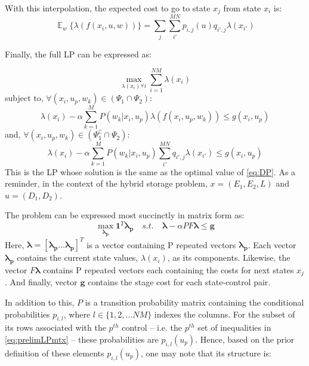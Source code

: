 \documentclass[conference]{IEEEtran}
\DeclareMathOperator{\E}{\mathbb{E}}
\begin{document}
With this interpolation, the expected cost to go to state $x_{j}$ from state $x_{i}$ is:
\begin{displaymath}
    \mathop{\E}_{w}\{\lambda(f(x_{i},u,w))\}=\sum_{j}\sum_{i'}^{MN}p_{i,j}(u)q_{i',j}\lambda(x_{i'})
\end{displaymath}

Finally, the full LP can be expressed as:

\begin{equation} \label{eq:prelimLP}
\max_{\lambda(x_{i}) \forall i} \sum_{i=1}^{NM} \lambda(x_{i})
\end{equation} subject to, $\forall (x_{i}, u_{p}, w_{k})\in(\Psi_{1}\cap\Psi_{2})$:
\begin{displaymath}
    \lambda(x_{i})-\alpha\sum_{k=1}^{M}P(w_{k} | x_{i},u_{p})\lambda(f(x_{i},u_{p},w_{k})) \leq g(x_{i},u_{p})
\end{displaymath} and, $\forall (x_{i}, u_{p}, w_{k})\in(\Psi_{1}^\complement\cap\Psi_{2})$:
\begin{displaymath}
    \lambda(x_{i})-\alpha\sum_{k=1}^{M}P(w_{k} | x_{i},u_{p})\sum_{i'}^{MN}q_{i',j}\lambda(x_{i'}) \leq g(x_{i},u_{p})
\end{displaymath} This is the LP whose solution is the same as the optimal value of \eqref{eq:DP}. As a reminder, in the context of the hybrid storage problem, $x=(E_{1},E_{2},L)$ and $u=(D_{1},D_{2})$.

The problem can be expressed most succinctly in matrix form as:
\begin{equation} \label{eq:prelimLPmtx}
    \max_{\boldsymbol{\lambda_{p}}} \boldsymbol{1}^{T} \boldsymbol{\lambda_{p}}
    \hspace{1em}s.t.\hspace{1em}
    \boldsymbol{\lambda}-\alpha PF\boldsymbol{\lambda} \leq \boldsymbol{g}
\end{equation} Here, $\boldsymbol{\lambda} = [\boldsymbol{\lambda_{p}}\hdots \boldsymbol{\lambda_{p}}]^{T}$ is a vector containing P repeated vectors $\boldsymbol{\lambda_{p}}$. Each vector $\boldsymbol{\lambda_{p}}$ contains the current state values, $\lambda(x_{i})$, as its components. Likewise, the vector $F\boldsymbol{\lambda}$ contains P repeated vectors each containing the costs for next states $x_{j}$. And finally, vector $\boldsymbol{g}$ contains the stage cost for each state-control pair. 

In addition to this, $P$ is a transition probability matrix containing the conditional probabilities $p_{i,l}$, where $l\in \{1,2,...NM\}$ indexes the columns. For the subset of its rows associated with the $p^{th}$ control -- i.e. the $p^{th}$ set of inequalities in \eqref{eq:prelimLPmtx} -- these probabilities are $p_{i,l}(u_{p})$. Hence, based on the prior definition of these elements $p_{i,l}(u_{p})$, one may note that its structure is:
\end{document}
